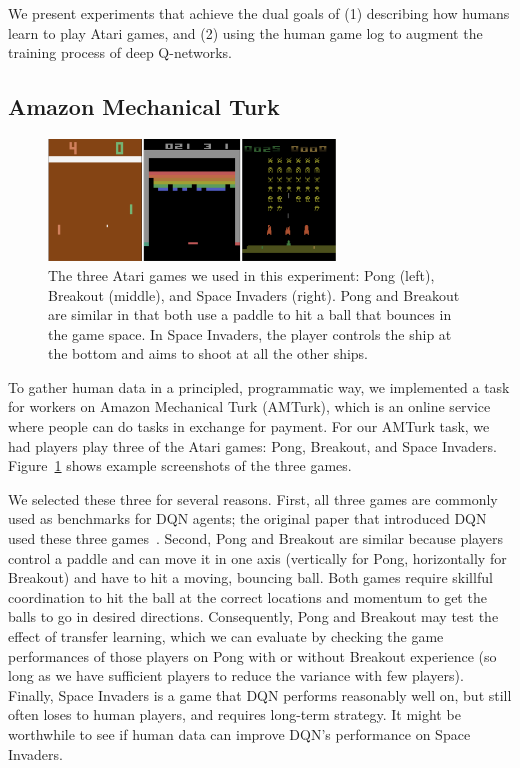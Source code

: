 \documentclass[letterpaper, 10 pt, conference]{ieeeconf}  %
\begin{document}
We present experiments that achieve the dual goals of (1) describing how humans learn to play Atari
games, and (2) using the human game log to augment the training process of deep Q-networks.

\subsection{Amazon Mechanical Turk}\label{ssec:human_experiment}

\begin{figure}[t]
\centering
\includegraphics[width=3in]{fig_atari_games}
\caption{The three Atari games we used in this experiment: Pong (left), Breakout (middle), and Space
Invaders (right). Pong and Breakout are similar in that both use a paddle to hit a ball that bounces
in the game space. In Space Invaders, the player controls the ship at the bottom and aims to shoot
at all the other ships.}
\label{fig:atari}
\end{figure}

To gather human data in a principled, programmatic way, we implemented a task for workers on Amazon
Mechanical Turk (AMTurk), which is an online service where people can do tasks in exchange for
payment. For our AMTurk task, we had players play three of the Atari games: Pong, Breakout, and
Space Invaders. Figure~\ref{fig:atari} shows example screenshots of the three games.

We selected these three for several reasons. First, all three games are commonly used as benchmarks
for DQN agents; the original paper that introduced DQN used these three
games~\cite{mnih-atari-2013}. Second, Pong and Breakout are similar because players control a
paddle and can move it in one axis (vertically for Pong, horizontally for Breakout) and have to
hit a moving, bouncing ball. Both games require skillful coordination to hit the
ball at the correct locations and momentum to get the balls to go in desired directions.
Consequently, Pong and Breakout may test the effect of transfer learning, which we can evaluate by
checking the game performances of those players on Pong with or without Breakout experience (so long
as we have sufficient players to reduce the variance with few players). Finally, Space Invaders is a
game that DQN performs reasonably well on, but still often loses to human players, and requires
long-term strategy. It might be worthwhile to see if human data can improve DQN's performance on
Space Invaders.
\end{document}
